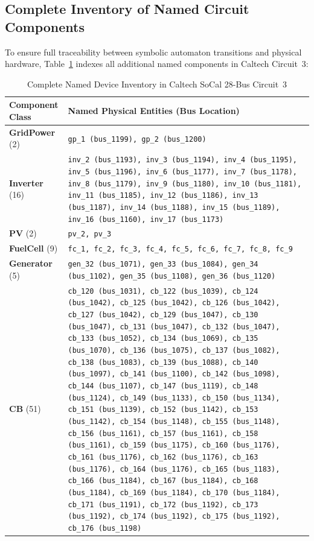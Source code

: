 \documentclass[journal]{IEEEtran}
\begin{document}
\subsection{Complete Inventory of Named Circuit Components}
To ensure full traceability between symbolic automaton transitions and physical hardware, Table~\ref{tab:caltech_named_inventory} indexes all additional named components in Caltech Circuit~3:
\begin{table}[!t]
\centering
\caption{Complete Named Device Inventory in Caltech SoCal 28-Bus Circuit~3}
\label{tab:caltech_named_inventory}
\scriptsize
\begin{tabularx}{\columnwidth}{@{}lX@{}}
\toprule
\textbf{Component Class} & \textbf{Named Physical Entities (Bus Location)} \\
\midrule
\textbf{GridPower} (2) & \texttt{gp\_1 (bus\_1199), gp\_2 (bus\_1200)} \\
\textbf{Inverter} (16) & \texttt{inv\_2 (bus\_1193), inv\_3 (bus\_1194), inv\_4 (bus\_1195), inv\_5 (bus\_1196), inv\_6 (bus\_1177), inv\_7 (bus\_1178), inv\_8 (bus\_1179), inv\_9 (bus\_1180), inv\_10 (bus\_1181), inv\_11 (bus\_1185), inv\_12 (bus\_1186), inv\_13 (bus\_1187), inv\_14 (bus\_1188), inv\_15 (bus\_1189), inv\_16 (bus\_1160), inv\_17 (bus\_1173)} \\
\textbf{PV} (2) & \texttt{pv\_2, pv\_3} \\
\textbf{FuelCell} (9) & \texttt{fc\_1, fc\_2, fc\_3, fc\_4, fc\_5, fc\_6, fc\_7, fc\_8, fc\_9} \\
\textbf{Generator} (5) & \texttt{gen\_32 (bus\_1071), gen\_33 (bus\_1084), gen\_34 (bus\_1102), gen\_35 (bus\_1108), gen\_36 (bus\_1120)} \\
\textbf{CB} (51) & \texttt{cb\_120 (bus\_1031), cb\_122 (bus\_1039), cb\_124 (bus\_1042), cb\_125 (bus\_1042), cb\_126 (bus\_1042), cb\_127 (bus\_1042), cb\_129 (bus\_1047), cb\_130 (bus\_1047), cb\_131 (bus\_1047), cb\_132 (bus\_1047), cb\_133 (bus\_1052), cb\_134 (bus\_1069), cb\_135 (bus\_1070), cb\_136 (bus\_1075), cb\_137 (bus\_1082), cb\_138 (bus\_1083), cb\_139 (bus\_1088), cb\_140 (bus\_1097), cb\_141 (bus\_1100), cb\_142 (bus\_1098), cb\_144 (bus\_1107), cb\_147 (bus\_1119), cb\_148 (bus\_1124), cb\_149 (bus\_1133), cb\_150 (bus\_1134), cb\_151 (bus\_1139), cb\_152 (bus\_1142), cb\_153 (bus\_1142), cb\_154 (bus\_1148), cb\_155 (bus\_1148), cb\_156 (bus\_1161), cb\_157 (bus\_1161), cb\_158 (bus\_1161), cb\_159 (bus\_1175), cb\_160 (bus\_1176), cb\_161 (bus\_1176), cb\_162 (bus\_1176), cb\_163 (bus\_1176), cb\_164 (bus\_1176), cb\_165 (bus\_1183), cb\_166 (bus\_1184), cb\_167 (bus\_1184), cb\_168 (bus\_1184), cb\_169 (bus\_1184), cb\_170 (bus\_1184), cb\_171 (bus\_1191), cb\_172 (bus\_1192), cb\_173 (bus\_1192), cb\_174 (bus\_1192), cb\_175 (bus\_1192), cb\_176 (bus\_1198)} \\

\end{tabularx}
\end{table}
\end{document}
